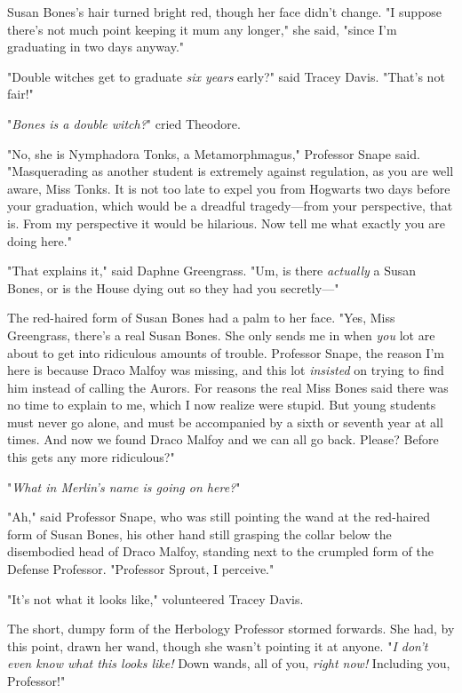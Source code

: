 Susan Bones's hair turned bright red, though her face didn't change. "I suppose
there's not much point keeping it mum any longer," she said, "since I'm
graduating in two days anyway."

"Double witches get to graduate \emph{six years} early?" said Tracey Davis.
"That's not fair!"

"\emph{Bones is a double witch?}" cried Theodore.

"No, she is Nymphadora Tonks, a Metamorphmagus," Professor Snape said.
"Masquerading as another student is extremely against regulation, as you are
well aware, Miss Tonks. It is not too late to expel you from Hogwarts two days
before your graduation, which would be a dreadful tragedy---from your
perspective, that is. From my perspective it would be hilarious. Now tell me
what exactly you are doing here."

"That explains it," said Daphne Greengrass. "Um, is there \emph{actually} a
Susan Bones, or is the House dying out so they had you secretly\mbox{---}"

The red-haired form of Susan Bones had a palm to her face. "Yes, Miss
Greengrass, there's a real Susan Bones. She only sends me in when \emph{you}
lot are about to get into ridiculous amounts of trouble. Professor Snape, the
reason I'm here is because Draco Malfoy was missing, and this lot
\emph{insisted} on trying to find him instead of calling the Aurors. For
reasons the real Miss Bones said there was no time to explain to me, which I
now realize were stupid. But young students must never go alone, and must be
accompanied by a sixth or seventh year at all times. And now we found Draco
Malfoy and we can all go back. Please? Before this gets any more ridiculous?"

"\emph{What in Merlin's name is going on here?}"

"Ah," said Professor Snape, who was still pointing the wand at the red-haired
form of Susan Bones, his other hand still grasping the collar below the
disembodied head of Draco Malfoy, standing next to the crumpled form of the
Defense Professor. "Professor Sprout, I perceive."

"It's not what it looks like," volunteered Tracey Davis.

The short, dumpy form of the Herbology Professor stormed forwards. She had, by
this point, drawn her wand, though she wasn't pointing it at anyone. "\emph{I
don't even know what this looks like!} Down wands, all of you, \emph{right
now!} Including you, Professor!"

